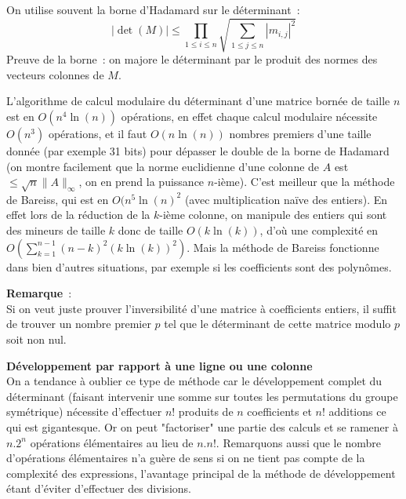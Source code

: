 \documentclass[a4paper,11pt]{article}
\begin{document}
On utilise souvent la borne d'Hadamard 
sur le d\'eterminant~:
\[ |\det(M)| \leq \prod_{1\leq i \leq n} 
\sqrt{\sum_{1\leq j \leq n} |m_{i,j}|^2}\]
Preuve de la borne~: on majore le déterminant par le produit des
normes des vecteurs colonnes de $M$.

L'algorithme de calcul modulaire du déterminant d'une matrice bornée
de taille $n$ est en $O(n^4 \ln(n))$ opérations, en effet 
chaque calcul modulaire
nécessite $O(n^3)$ opérations, et il faut $O(n\ln(n))$ nombres premiers
d'une taille donnée (par exemple 31 bits)
pour dépasser le double de la borne de Hadamard 
(on montre facilement que la norme
euclidienne d'une colonne de $A$ est $\leq \sqrt{n}\|A\|_\infty$,
on en prend la puissance $n$-ième).
C'est meilleur que la méthode de Bareiss, qui est en 
$O(n^5 \ln(n)^2$ (avec multiplication naïve des entiers). En effet
lors de la réduction de la $k$-ième colonne, on manipule des entiers
qui sont des mineurs de taille $k$ donc de taille $O(k\ln(k))$, d'où
une complexité en $O(\sum_{k=1}^{n-1} (n-k)^2 (k\ln(k))^2 )$. Mais
la méthode de Bareiss fonctionne dans bien d'autres situations, par
exemple si les coefficients sont des polynômes.

{\bf Remarque}~:\\
Si on veut juste prouver l'inversibilité d'une matrice \`a coefficients
entiers, il suffit
de trouver un nombre premier $p$ tel que le déterminant de cette matrice modulo
$p$ soit non nul.

{\bf Développement par rapport à une ligne ou une colonne}\\
On a tendance à oublier ce type de méthode car le développement
complet du déterminant (faisant intervenir une somme sur toutes les
permutations du groupe symétrique)
nécessite d'effectuer $n!$ produits
de $n$ coefficients et $n!$ additions ce qui est gigantesque. Or on peut
"factoriser" une partie des calculs et se ramener à $n.2^n$ opérations
élémentaires au lieu de $n.n!$. Remarquons aussi que le nombre
d'opérations élémentaires n'a guère de sens si on ne tient pas
compte de la complexité des expressions, l'avantage principal
de la méthode de développement étant d'éviter d'effectuer
des divisions.
\end{document}
